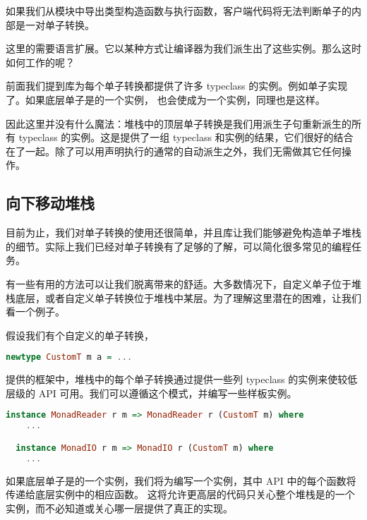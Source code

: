 \documentclass[./main.tex]{subfiles}
\begin{document}
如果我们从模块中导出类型构造函数与执行函数，客户端代码将无法判断单子的内部是一对单子转换。

这里的需要语言扩展。它以某种方式让编译器为我们派生出了这些实例。那么这时如何工作的呢？

前面我们提到库为每个单子转换都提供了许多 typeclass 的实例。例如单子实现了。如果底层单子是的一个实例，
也会使成为一个实例，同理也是这样。

因此这里并没有什么魔法：堆栈中的顶层单子转换是我们用派生子句重新派生的所有 typeclass 的实例。这是提供了一组 typeclass 和实例的结果，它们很好的结合
在了一起。除了可以用声明执行的通常的自动派生之外，我们无需做其它任何操作。

\subsection*{向下移动堆栈}

目前为止，我们对单子转换的使用还很简单，并且库让我们能够避免构造单子堆栈的细节。实际上我们已经对单子转换有了足够的了解，可以简化很多常见的编程任务。

有一些有用的方法可以让我们脱离带来的舒适。大多数情况下，自定义单子位于堆栈底层，或者自定义单子转换位于堆栈中某层。为了理解这里潜在的困难，让我们看一个例子。

假设我们有个自定义的单子转换，

\begin{lstlisting}[language=Haskell]
  newtype CustomT m a = ...
\end{lstlisting}

提供的框架中，堆栈中的每个单子转换通过提供一些列 typeclass 的实例来使较低层级的 API 可用。我们可以遵循这个模式，并编写一些样板实例。

\begin{lstlisting}[language=Haskell]
  instance MonadReader r m => MonadReader r (CustomT m) where
    ...

  instance MonadIO r m => MonadIO r (CustomT m) where
    ...
\end{lstlisting}

如果底层单子是的一个实例，我们将为编写一个实例，其中 API 中的每个函数将传递给底层实例中的相应函数。
这将允许更高层的代码只关心整个堆栈是的一个实例，而不必知道或关心哪一层提供了真正的实现。
\end{document}
